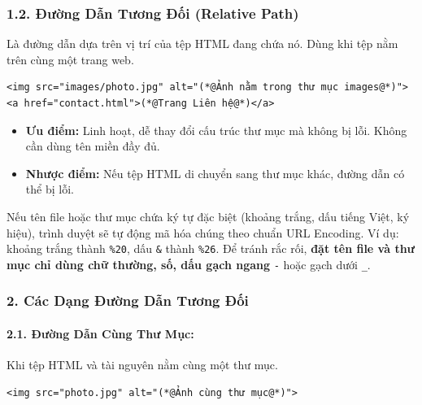 \documentclass[11pt,oneside]{book}
\newcommand{\codeinline}[1]{\textcolor{accentOrange}{\texttt{#1}}}
\begin{document}
\subsubsection*{1.2. Đường Dẫn Tương Đối (Relative Path)}

Là đường dẫn dựa trên vị trí của tệp HTML đang chứa nó. Dùng khi tệp nằm trên cùng một trang web.

\begin{codeWindow}
\begin{lstlisting}[language=HTML5]
<img src="images/photo.jpg" alt="(*@Ảnh nằm trong thư mục images@*)">
<a href="contact.html">(*@Trang Liên hệ@*)</a>
\end{lstlisting}
\end{codeWindow}

\begin{itemize}[leftmargin=1.5em, itemsep=2pt, parsep=0pt]
    \item \textbf{Ưu điểm:} Linh hoạt, dễ thay đổi cấu trúc thư mục mà không bị lỗi. Không cần dùng tên miền đầy đủ.
    \item \textbf{Nhược điểm:} Nếu tệp HTML di chuyển sang thư mục khác, đường dẫn có thể bị lỗi.
\end{itemize}

\begin{noteBox}
Nếu tên file hoặc thư mục chứa ký tự đặc biệt (khoảng trắng, dấu tiếng Việt, ký hiệu), trình duyệt sẽ tự động mã hóa chúng theo chuẩn URL Encoding. Ví dụ: khoảng trắng thành \codeinline{\%20}, dấu \codeinline{\&} thành \codeinline{\%26}. Để tránh rắc rối, \textbf{đặt tên file và thư mục chỉ dùng chữ thường, số, dấu gạch ngang} \codeinline{-} hoặc gạch dưới \codeinline{\_}.
\end{noteBox}

\subsubsection{2. Các Dạng Đường Dẫn Tương Đối}

\paragraph{2.1. Đường Dẫn Cùng Thư Mục:}
Khi tệp HTML và tài nguyên nằm cùng một thư mục.

\begin{codeWindow}
\begin{lstlisting}[language=HTML5]
<img src="photo.jpg" alt="(*@Ảnh cùng thư mục@*)">
\end{lstlisting}
\end{codeWindow}
\end{document}
